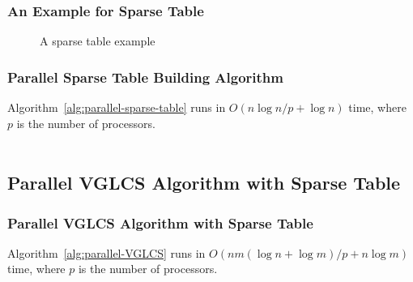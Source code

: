 \begin{withoutheadline}
\begin{frame}
	\frametitle{An Example for Sparse Table}
	\begin{figure}[!thb]
	  \centering {} 
	  \caption{A sparse table example}
	  \label{fig:interval-decomposition}
	\end{figure}
\end{frame}
\end{withoutheadline}

\begin{withoutheadline}
\begin{frame}
	\frametitle{Parallel Sparse Table Building Algorithm}
	Algorithm~\ref{alg:parallel-sparse-table} runs in $O(n \log n / p
	+ \log n)$ time, where $p$ is the number of processors.
	\\~\\
	
\end{frame}
\end{withoutheadline}


\subsection{Parallel VGLCS Algorithm with Sparse Table}
\begin{withoutheadline}
\begin{frame}
	\frametitle{Parallel VGLCS Algorithm with Sparse Table}
	Algorithm~\ref{alg:parallel-VGLCS} runs in $O(n m (\log n + \log m)
	/ p + n \log m)$ time, where $p$ is the number of processors.
	\\~\\
	\begin{center}
		\scalebox{.7} { \begin{minipage}{1.4\textwidth}
			
			\end{minipage}
		}
	\end{center}
\end{frame}
\end{withoutheadline}